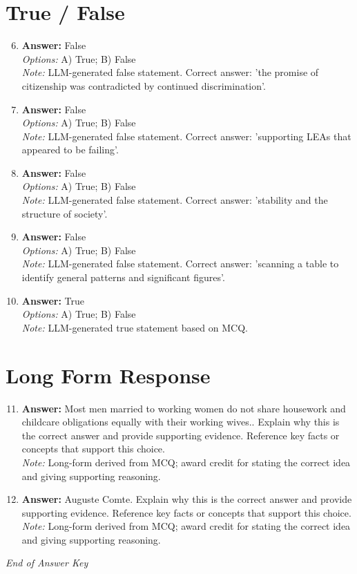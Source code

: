\documentclass[12pt]{article}
\begin{document}
\section*{True / False}
\begin{enumerate}[label=\arabic*.]
\setcounter{enumi}{5}
\item \textbf{Answer:} False
\\ \textit{Options:} A) True; B) False
\\ \textit{Note:} LLM-generated false statement. Correct answer: 'the promise of citizenship was contradicted by continued discrimination'.
\item \textbf{Answer:} False
\\ \textit{Options:} A) True; B) False
\\ \textit{Note:} LLM-generated false statement. Correct answer: 'supporting LEAs that appeared to be failing'.
\item \textbf{Answer:} False
\\ \textit{Options:} A) True; B) False
\\ \textit{Note:} LLM-generated false statement. Correct answer: 'stability and the structure of society'.
\item \textbf{Answer:} False
\\ \textit{Options:} A) True; B) False
\\ \textit{Note:} LLM-generated false statement. Correct answer: 'scanning a table to identify general patterns and significant figures'.
\item \textbf{Answer:} True
\\ \textit{Options:} A) True; B) False
\\ \textit{Note:} LLM-generated true statement based on MCQ.
\end{enumerate}

\section*{Long Form Response}
\begin{enumerate}[label=\arabic*.]
\setcounter{enumi}{10}
\item \textbf{Answer:} Most men married to working women do not share housework and childcare obligations equally with their working wives.. Explain why this is the correct answer and provide supporting evidence. Reference key facts or concepts that support this choice.
\\ \textit{Note:} Long-form derived from MCQ; award credit for stating the correct idea and giving supporting reasoning.
\item \textbf{Answer:} Auguste Comte. Explain why this is the correct answer and provide supporting evidence. Reference key facts or concepts that support this choice.
\\ \textit{Note:} Long-form derived from MCQ; award credit for stating the correct idea and giving supporting reasoning.
\end{enumerate}

\vfill
\noindent\textit{End of Answer Key}
\end{document}
